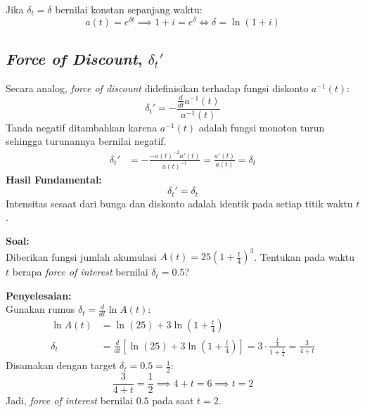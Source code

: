 \documentclass[11pt,a4paper]{article}
\begin{document}
\begin{notebox}
Jika $\delta_t = \delta$ bernilai konstan sepanjang waktu:
\begin{equation}
    a(t) = e^{\delta t} \implies 1 + i = e^\delta \iff \delta = \ln(1 + i)
\end{equation}
\end{notebox}

\subsection{\textit{Force of Discount}, $\delta_t'$}
Secara analog, \textit{force of discount} didefinisikan terhadap fungsi diskonto $a^{-1}(t)$:
\begin{equation}
    \delta_t' = -\frac{\frac{d}{dt} a^{-1}(t)}{a^{-1}(t)}
\end{equation}
Tanda negatif ditambahkan karena $a^{-1}(t)$ adalah fungsi monoton turun sehingga turunannya bernilai negatif.
\begin{align*}
    \delta_t' &= -\frac{-a(t)^{-2} a'(t)}{a(t)^{-1}} = \frac{a'(t)}{a(t)} = \delta_t
\end{align*}
\textbf{Hasil Fundamental:}
\begin{equation}
    \delta_t' = \delta_t
\end{equation}
Intensitas sesaat dari bunga dan diskonto adalah identik pada setiap titik waktu $t$.

\begin{examplebox}
\textbf{Soal:}\\
Diberikan fungsi jumlah akumulasi $A(t) = 25\left(1 + \frac{t}{4}\right)^3$. Tentukan pada waktu $t$ berapa \textit{force of interest} bernilai $\delta_t = 0.5$?

\vspace{0.5em}
\textbf{Penyelesaian:}\\
Gunakan rumus $\delta_t = \frac{d}{dt} \ln A(t)$:
\begin{align*}
    \ln A(t) &= \ln(25) + 3 \ln\left(1 + \frac{t}{4}\right) \\[0.5em]
    \delta_t &= \frac{d}{dt} \left[ \ln(25) + 3 \ln\left(1 + \frac{t}{4}\right) \right] = 3 \cdot \frac{\frac{1}{4}}{1 + \frac{t}{4}} = \frac{3}{4 + t}
\end{align*}
Disamakan dengan target $\delta_t = 0.5 = \frac{1}{2}$:
\begin{equation*}
    \frac{3}{4 + t} = \frac{1}{2} \implies 4 + t = 6 \implies t = 2
\end{equation*}
Jadi, \textit{force of interest} bernilai $0.5$ pada saat $t = 2$.
\end{examplebox}
\end{document}
